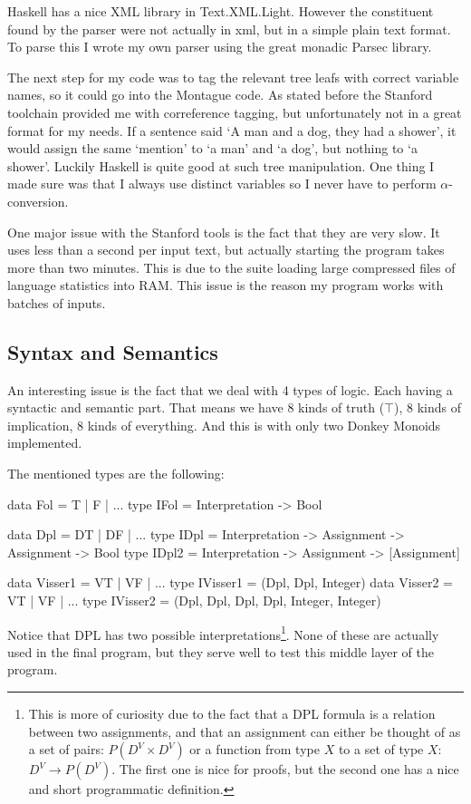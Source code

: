 \documentclass[12pt]{article}
\begin{document}
Haskell has a nice XML library in Text.XML.Light. However the constituent found by the parser were not actually in xml, but in a simple plain text format. To parse this I wrote my own parser using the great monadic Parsec library.

The next step for my code was to tag the relevant tree leafs with correct variable names, so it could go into the Montague code. As stated before the Stanford toolchain provided me with correference tagging, but unfortunately not in a great format for my needs. If a sentence said `A man and a dog, they had a shower', it would assign the same `mention' to `a man' and `a dog', but nothing to `a shower'. Luckily Haskell is quite good at such tree manipulation. One thing I made sure was that I always use distinct variables so I never have to perform $\alpha$-conversion.

One major issue with the Stanford tools is the fact that they are very slow. It uses less than a second per input text, but actually starting the program takes more than two minutes. This is due to the suite loading large compressed files of language statistics into RAM. This issue is the reason my program works with batches of inputs.

\subsection{Syntax and Semantics}

An interesting issue is the fact that we deal with 4 types of logic. Each having a syntactic and semantic part. That means we have 8 kinds of truth ($\top$), 8 kinds of implication, 8 kinds of everything. And this is with only two Donkey Monoids implemented.

The mentioned types are the following:

\begin{haskell}
data Fol = T | F | ...
type IFol = Interpretation -> Bool

data Dpl = DT | DF | ...
type IDpl = Interpretation -> Assignment -> Assignment -> Bool
type IDpl2 = Interpretation -> Assignment -> [Assignment]

data Visser1 = VT | VF | ...
type IVisser1 = (Dpl, Dpl, Integer)
data Visser2 = VT | VF | ...
type IVisser2 = (Dpl, Dpl, Dpl, Dpl, Integer, Integer)
\end{haskell}

Notice that DPL has two possible interpretations\footnote{This is more of curiosity due to the fact that a DPL formula is a relation between two assignments, and that an assignment can either be thought of as a set of pairs: $P(D^V \times D^V)$ or a function from type $X$ to a set of type $X$: $D^V \rightarrow P(D^V)$. The first one is nice for proofs, but the second one has a nice and short programmatic definition.}. None of these are actually used in the final program, but they serve well to test this middle layer of the program.
\end{document}
